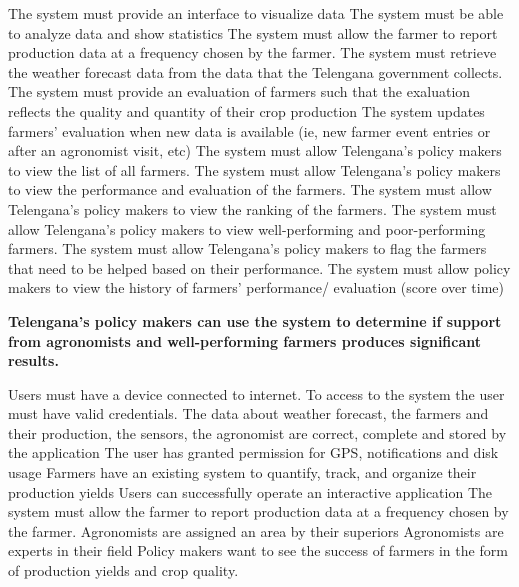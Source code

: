 \begin{itemize}
\begin{itemize}
 The system must provide an interface to visualize data
 The system must be able to analyze data and show statistics
 The system must allow the farmer to report production data at a frequency chosen by the farmer.
 The system must retrieve the weather forecast data from the data that the Telengana government collects.
  The system must provide an evaluation of farmers such that the exaluation reflects the quality and quantity of their crop production
  The system updates farmers' evaluation when new data is available (ie, new farmer event entries or after an agronomist visit, etc)
 The system must allow Telengana’s policy makers to view the list of all farmers.
 The system must allow Telengana’s policy makers to view the performance and evaluation of the farmers.
 The system must allow Telengana’s policy makers to view the ranking of the farmers.
 The system must allow Telengana’s policy makers to view well-performing and poor-performing farmers.
 The system must allow Telengana’s policy makers to flag the farmers that need to be helped based on their performance.
 The system must allow policy makers to view the history of farmers’ performance/ evaluation (score over time)
\end{itemize}

 \textbf{Telengana’s policy makers can use the system to determine if support from agronomists and well-performing farmers produces significant results.}

\begin{itemize}
  Users must have a device connected to internet.
 To access to the system the user must have valid credentials.
 The data about weather forecast, the farmers and their production, the sensors, the agronomist are correct, complete and stored by the application
 The user has granted permission for GPS, notifications and disk usage
 Farmers have an existing system to quantify, track, and organize their production yields
 Users can successfully operate an interactive application
 The system must allow the farmer to report production data at a frequency chosen by the farmer.
 Agronomists are assigned an area by their superiors
 Agronomists are experts in their field
 Policy makers want to see the success of farmers in the form of production yields and crop quality.


\end{itemize}
\end{itemize}
